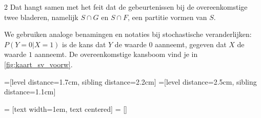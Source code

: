 \begin{multicols} {2}
Dat hangt samen met het feit dat de gebeurtenissen bij de overeenkomstige twee bladeren, namelijk $S \cap G$ en $S \cap F$, een partitie vormen van $S$. 

We gebruiken analoge benamingen en notaties bij stochastische veranderlijken: $P(Y=0 | X=1)$ is de kans dat $Y$ de waarde $0$ aanneemt, gegeven dat $X$ de waarde $1$ aanneemt. De overeenkomstige kansboom vind je in \autoref{fig:kaart_sv_voorw}.
\vspace{0.5cm}

=[level distance=1.7cm, sibling distance=2.2cm]
=[level distance=2.5cm, sibling distance=1.1cm]

 = [text width=1em, text centered]
 = []


\end{multicols}
